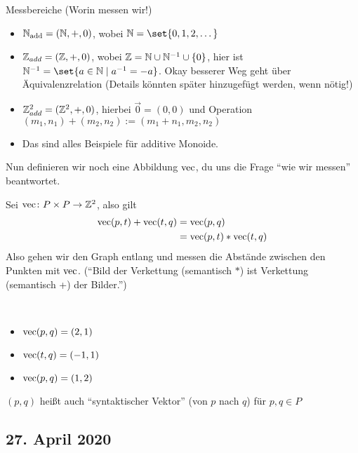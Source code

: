 Messbereiche (Worin messen wir!)
\begin{itemize}
    \item $\mathbb{N}_{\operatorname{add}} =(\mathbb{N},+,0)$, wobei $\N = \set{0,1,2,\dots}$
    \item $\mathbb{Z}_{add} = (\mathbb{Z},+,0)$, wobei $\mathbb{Z} = \mathbb{N} \cup \mathbb{N}^{-1}\cup \{0\}$, hier ist $\N^{-1} = \set{a \in \N \mid a^{-1} = -a}$. Okay besserer Weg geht über Äquivalenzrelation (Details könnten später hinzugefügt werden, wenn nötig!)
    \item $\mathbb{Z}^2_{add} = (\mathbb{Z}^2, +,0)$, hierbei $\Vec{0} = (0,0)$ und Operation $(m_1,n_1) + (m_2,n_2) := (m_1+n_1,m_2,n_2)$
    \item Das sind alles Beispiele für additive Monoide.
\end{itemize}
Nun definieren wir noch eine Abbildung $\operatorname{vec}$, du uns die Frage ``wie wir messen'' beantwortet.
\begin{definition}
    Sei $\operatorname{vec} \colon P \times P \to \mathbb{Z}^2$, also gilt
    \begin{align*}
        \operatorname{vec}(p,t) + \operatorname{vec}(t,q) &= \operatorname{vec}(p,q)\\
        &= \operatorname{vec}(p,t) \ast \operatorname{vec}(t,q)
    \end{align*}
    Also gehen wir den Graph entlang und messen die Abstände zwischen den Punkten mit $\operatorname{vec}$. (``Bild der Verkettung (semantisch $\ast$) ist Verkettung (semantisch +) der Bilder.'')
\end{definition}
\begin{example}\mylinebreak\\
    \begin{minipage}{.5\textwidth}
        
    \end{minipage}%
    \begin{minipage}{.45\textwidth}
        \begin{itemize}
        \item $\operatorname{vec}(p,q) = (2,1)$
        \item $\operatorname{vec}(t,q) = (-1,1)$
        \item $\operatorname{vec}(p,q) = (1,2)$
        \end{itemize}
    \end{minipage}
\end{example}
\begin{remark}
    $(p,q)$ heißt auch ``syntaktischer Vektor'' (von $p$ nach $q$) für $p,q \in P$
\end{remark}
\subsection*{27. April 2020}
